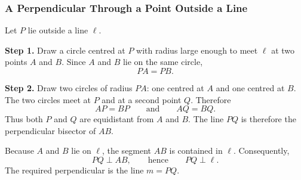 \begin{center}
\end{center}

\subsubsection{A Perpendicular Through a Point Outside a Line}

Let $P$ lie outside a line $\ell$.

\textbf{Step 1.} Draw a circle centred at $P$ with radius large enough to meet
$\ell$ at two points $A$ and $B$. Since $A$ and $B$ lie on the same circle,
\[
PA=PB.
\]

\textbf{Step 2.} Draw two circles of radius $PA$: one centred at $A$ and one
centred at $B$. The two circles meet at $P$ and at a second point $Q$. Therefore
\[
AP=BP
\qquad\text{and}\qquad
AQ=BQ.
\]
Thus both $P$ and $Q$ are equidistant from $A$ and $B$. The line $PQ$ is
therefore the perpendicular bisector of $AB$.

Because $A$ and $B$ lie on $\ell$, the segment $AB$ is contained in $\ell$.
Consequently,
\[
PQ\perp AB,
\qquad\text{hence}\qquad
PQ\perp\ell.
\]
The required perpendicular is the line $m=PQ$.

